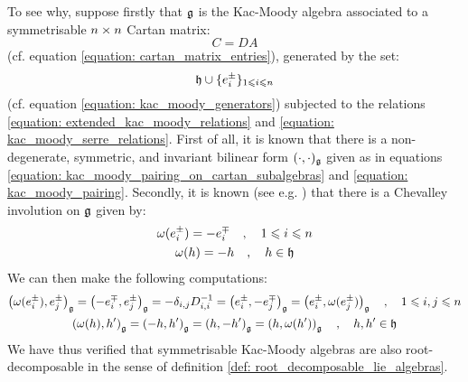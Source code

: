 \begin{example}
            To see why, suppose firstly that $\mathfrak{g}$ is the Kac-Moody algebra associated to a symmetrisable $n \x n$ Cartan matrix:
                $$C = DA$$
            (cf. equation \eqref{equation: cartan_matrix_entries}), generated by the set:
                $$\mathfrak{h} \cup \{e_i^{\pm}\}_{1\leqslant i \leqslant n}$$
            (cf. equation \ref{equation: kac_moody_generators}) subjected to the relations \eqref{equation: extended_kac_moody_relations} and \eqref{equation: kac_moody_serre_relations}. First of all, it is known that there is a non-degenerate, symmetric, and invariant bilinear form $(\cdot, \cdot)_{\mathfrak{g}}$ given as in equations \eqref{equation: kac_moody_pairing_on_cartan_subalgebras} and \eqref{equation: kac_moody_pairing}. Secondly, it is known (see e.g. \cite[Theorem 1.2]{kac_infinite_dimensional_lie_algebras}) that there is a Chevalley involution on $\mathfrak{g}$ given by:
                \begin{equation} \label{equation: symmetrisable_kac_moody_chevalley_involution}
                    \begin{gathered}
                        \omega(e_i^{\pm}) = -e_i^{\mp} \quad, \quad 1 \leqslant i \leqslant n
                        \\
                        \omega(h) = -h \quad, \quad h \in \mathfrak{h}
                    \end{gathered}
                \end{equation}
            We can then make the following computations:
                \begin{equation} \label{equation: kac_moody_pairing_cartan_equivariance}
                    \begin{gathered}
                        \left( \omega(e_i^{\pm}), e_j^{\pm} \right)_{\mathfrak{g}} = \left( -e_i^{\mp}, e_j^{\pm} \right)_{\mathfrak{g}} = -\delta_{i, j} D_{i, i}^{-1} = \left( e_i^{\pm}, -e_j^{\mp} \right)_{\mathfrak{g}} = \left( e_i^{\pm}, \omega(e_j^{\pm}) \right)_{\mathfrak{g}} \quad, \quad 1 \leqslant i, j \leqslant n
                        \\
                        \left( \omega(h), h' \right)_{\mathfrak{g}} = \left( -h, h' \right)_{\mathfrak{g}} = \left( h, -h' \right)_{\mathfrak{g}} = \left( h, \omega(h') \right)_{\mathfrak{g}} \quad, \quad h, h' \in \mathfrak{h}
                    \end{gathered}
                \end{equation}
            We have thus verified that symmetrisable Kac-Moody algebras are also root-decomposable in the sense of definition \ref{def: root_decomposable_lie_algebras}.
        \end{example}

